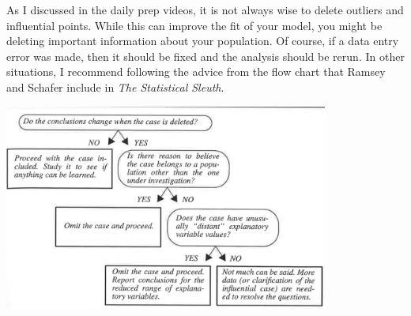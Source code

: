 \documentclass[
  letterpaper,
  DIV=11,
  numbers=noendperiod]{scrartcl}
\begin{document}
As I discussed in the daily prep videos, it is not always wise to delete
outliers and influential points. While this can improve the fit of your
model, you might be deleting important information about your
population. Of course, if a data entry error was made, then it should be
fixed and the analysis should be rerun. In other situations, I recommend
following the advice from the flow chart that Ramsey and Schafer include
in \emph{The Statistical Sleuth}.

\includegraphics[width=0.8\textwidth,height=\textheight]{img/sleuth_outlier_flowchart.png}
\end{document}
